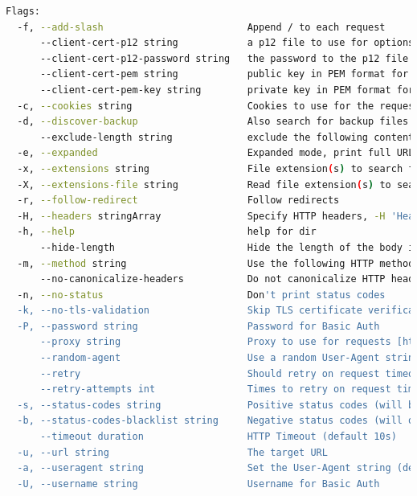 \documentclass[12 pt]{article}
\begin{document}
\begin{lstlisting}[language=bash]
Flags:
  -f, --add-slash                         Append / to each request
      --client-cert-p12 string            a p12 file to use for options TLS client certificates
      --client-cert-p12-password string   the password to the p12 file
      --client-cert-pem string            public key in PEM format for optional TLS client certificates
      --client-cert-pem-key string        private key in PEM format for optional TLS client certificates (this key needs to have no password)
  -c, --cookies string                    Cookies to use for the requests
  -d, --discover-backup                   Also search for backup files by appending multiple backup extensions
      --exclude-length string             exclude the following content lengths (completely ignores the status). You can separate multiple lengths by comma and it also supports ranges like 203-206
  -e, --expanded                          Expanded mode, print full URLs
  -x, --extensions string                 File extension(s) to search for
  -X, --extensions-file string            Read file extension(s) to search from the file
  -r, --follow-redirect                   Follow redirects
  -H, --headers stringArray               Specify HTTP headers, -H 'Header1: val1' -H 'Header2: val2'
  -h, --help                              help for dir
      --hide-length                       Hide the length of the body in the output
  -m, --method string                     Use the following HTTP method (default "GET")
      --no-canonicalize-headers           Do not canonicalize HTTP header names. If set header names are sent as is.
  -n, --no-status                         Don't print status codes
  -k, --no-tls-validation                 Skip TLS certificate verification
  -P, --password string                   Password for Basic Auth
      --proxy string                      Proxy to use for requests [http(s)://host:port] or [socks5://host:port]
      --random-agent                      Use a random User-Agent string
      --retry                             Should retry on request timeout
      --retry-attempts int                Times to retry on request timeout (default 3)
  -s, --status-codes string               Positive status codes (will be overwritten with status-codes-blacklist if set). Can also handle ranges like 200,300-400,404.
  -b, --status-codes-blacklist string     Negative status codes (will override status-codes if set). Can also handle ranges like 200,300-400,404. (default "404")
      --timeout duration                  HTTP Timeout (default 10s)
  -u, --url string                        The target URL
  -a, --useragent string                  Set the User-Agent string (default "gobuster/3.6")
  -U, --username string                   Username for Basic Auth


\end{lstlisting}
\end{document}

